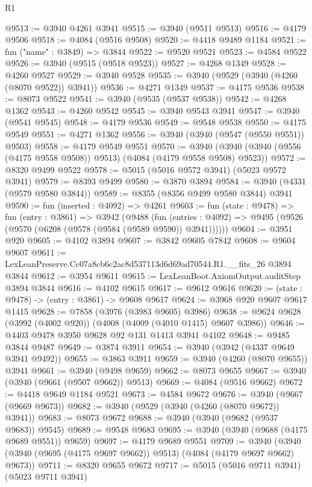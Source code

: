 \begin{lexlean}{R1}
\begin{coremodule}
@9513 := @3940 @4261 @3941
@9515 := @3940 (@9511 @9513)
@9516 := @4179 @9506
@9518 := @4084 (@9516 @9508)
@9520 := @4418 @9489 @1184
@9521 := fun ("name" : @3849) => @3844
@9522 := @9520 @9521
@9523 := @4584 @9522
@9526 := @3940 (@9515 (@9518 @9523))
@9527 := @4268 @1349
@9528 := @4260 @9527
@9529 := @3940 @9528
@9535 := @3940 (@9529 (@3940 (@4260 (@8070 @9522)) @3941))
@9536 := @4271 @1349
@9537 := @4175 @9536
@9538 := @8073 @9522
@9541 := @3940 (@9535 (@9537 @9538))
@9542 := @4268 @1362
@9543 := @4260 @9542
@9545 := @3940 @9543 @3941
@9547 := @3940 (@9541 @9545)
@9548 := @4179 @9536
@9549 := @9548 @9538
@9550 := @4175 @9549
@9551 := @4271 @1362
@9556 := @3940 (@3940 (@9547 (@9550 @9551)) @9503)
@9558 := @4179 @9549 @9551
@9570 := @3940 (@3940 (@3940 (@9556 (@4175 @9558 @9508)) @9513) (@4084 (@4179 @9558 @9508) @9523))
@9572 := @8320 @9499 @9522
@9578 := @5015 (@5016 @9572 @3941) (@5023 @9572 @3941)
@9579 := @8393 @9499
@9580 := @3870 @3894
@9584 := @3940 (@4331 (@9579 @9580 @3844))
@9589 := @8355 (@8356 @9499 @9580 @3844) @3941
@9590 := fun (inserted : @4092) => @4261
@9603 := fun (state : @9478) =>
  fun (entry : @3861) =>
  @3942
    (@9488
      (fun (entries : @4092) => @9495 (@9526 (@9570 (@6208 (@9578 (@9584 (@9589 @9590)) @3941))))))
@9604 := @3951 @920
@9605 := @4102 @3894
@9607 := @3842 @9605 @7842
@9608 := @9604 @9607
@9611 := LexLeanPreserve.Cc07a8cb6c2ac8d537113d6d69ad70544.R1.__fits_26 @3894 @3844
@9612 := @3954 @9611
@9615 := LexLeanBoot.AxiomOutput.auditStep @3894 @3844
@9616 := @4102 @9615
@9617 := @9612 @9616
@9620 := (state : @9478) -> (entry : @3861) -> @9608 @9617
@9624 := @3968 @920 @9607 @9617 @1415
@9628 := @7858 (@3976 (@3983 @9605) @3986)
@9638 := @9624 @9628 (@3992 (@4002 @920)) (@4008 (@4009 (@4010 @1415) @9607 @3986))
@9646 := @4403 @9478 @3950 @9628 @92 @131 @1413 @3941 @4102
@9648 := @9485 @3844 @9487
@9649 := @3874 @3911
@9654 := @3940 (@3942 (@4337 @9649 @3941 @9492))
@9655 := @3863 @3911
@9659 := @3940 (@4260 (@8070 @9655)) @3941
@9661 := @3940 (@9498 @9659)
@9662 := @8073 @9655
@9667 := @3940 (@3940 (@9661 (@9507 @9662)) @9513)
@9669 := @4084 (@9516 @9662)
@9672 := @4418 @9649 @1184 @9521
@9673 := @4584 @9672
@9676 := @3940 (@9667 (@9669 @9673))
@9682 := @3940 (@9529 (@3940 (@4260 (@8070 @9672)) @3941))
@9683 := @8073 @9672
@9688 := @3940 (@3940 (@9682 (@9537 @9683)) @9545)
@9689 := @9548 @9683
@9695 := @3940 (@3940 (@9688 (@4175 @9689 @9551)) @9659)
@9697 := @4179 @9689 @9551
@9709 := @3940 (@3940 (@3940 (@9695 (@4175 @9697 @9662)) @9513) (@4084 (@4179 @9697 @9662) @9673))
@9711 := @8320 @9655 @9672
@9717 := @5015 (@5016 @9711 @3941) (@5023 @9711 @3941)

\end{coremodule}
\end{lexlean}
